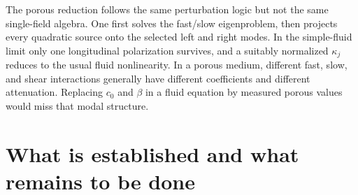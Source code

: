 \documentclass[11pt]{article}
\begin{document}
The porous reduction follows the same perturbation logic but not the same
single-field algebra.  One first solves the fast/slow eigenproblem, then
projects every quadratic source onto the selected left and right modes.  In the
simple-fluid limit only one longitudinal polarization survives, and a suitably
normalized \(\kappa_j\) reduces to the usual fluid nonlinearity.  In a porous
medium, different fast, slow, and shear interactions generally have different
coefficients and different attenuation.  Replacing \(c_0\) and \(\beta\) in a
fluid equation by measured porous values would miss that modal structure.

\section{What is established and what remains to be done}
\end{document}
